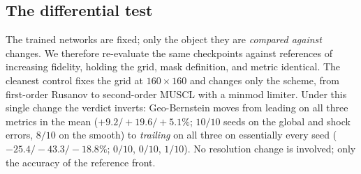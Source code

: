 \documentclass[11pt]{article}
\begin{document}
\subsection{The differential test}\label{sec:differential}
The trained networks are fixed; only the object they are \emph{compared
against} changes. We therefore re-evaluate the same checkpoints against
references of increasing fidelity, holding the grid, mask definition, and metric
identical. The cleanest control fixes the grid at $160\times160$ and changes only
the scheme, from first-order Rusanov to second-order MUSCL with a minmod limiter.
Under this single change the verdict inverts: Geo-Bernstein moves from leading
on all three metrics in the mean ($+9.2/+19.6/+5.1\%$; $10/10$ seeds on the global
and shock errors, $8/10$ on the smooth) to \emph{trailing} on all three on
essentially every seed ($-25.4/-43.3/-18.8\%$; $0/10$, $0/10$, $1/10$). No resolution change is involved;
only the accuracy of the reference front.
\end{document}
